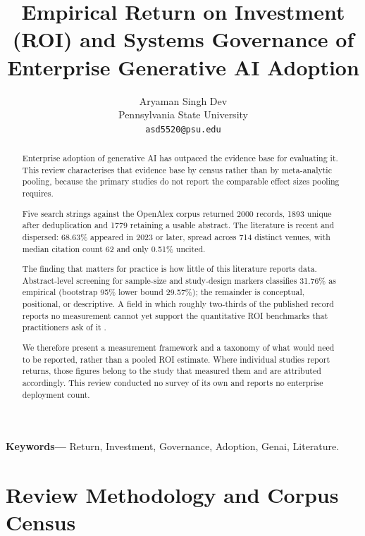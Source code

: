 \documentclass[10pt,twocolumn,letterpaper]{article}
\begin{document}
\title{Empirical Return on Investment (ROI) and Systems Governance of Enterprise Generative AI Adoption}

\author{
Aryaman Singh Dev\\
Pennsylvania State University \\
\texttt{asd5520@psu.edu}
}

\maketitle

\begin{abstract}
Enterprise adoption of generative AI has outpaced the evidence base for evaluating it. This review characterises that evidence base by census rather than by meta-analytic pooling, because the primary studies do not report the comparable effect sizes pooling requires.

Five search strings against the OpenAlex corpus returned 2000 records, 1893 unique after deduplication and 1779 retaining a usable abstract. The literature is recent and dispersed: 68.63\% appeared in 2023 or later, spread across 714 distinct venues, with median citation count 62 and only 0.51\% uncited.

The finding that matters for practice is how little of this literature reports data. Abstract-level screening for sample-size and study-design markers classifies 31.76\% as empirical (bootstrap 95\% lower bound 29.57\%); the remainder is conceptual, positional, or descriptive. A field in which roughly two-thirds of the published record reports no measurement cannot yet support the quantitative ROI benchmarks that practitioners ask of it \cite{crossref_10_2139_ssrn_6374778}.

We therefore present a measurement framework and a taxonomy of what would need to be reported, rather than a pooled ROI estimate. Where individual studies report returns, those figures belong to the study that measured them and are attributed accordingly. This review conducted no survey of its own and reports no enterprise deployment count.
\end{abstract}

\noindent\textbf{Keywords---} Return, Investment, Governance, Adoption, Genai, Literature.





\section{Review Methodology and Corpus Census}
\end{document}
